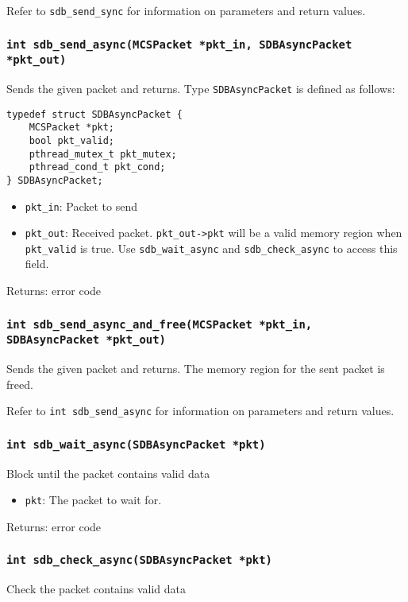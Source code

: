 \documentclass[12pt,a4paper]{report}
\begin{document}
Refer to \texttt{sdb\_send\_sync} for information on parameters and return values.

\subsubsection*{\texttt{int sdb\_send\_async(MCSPacket *pkt\_in, SDBAsyncPacket *pkt\_out)}}
Sends the given packet and returns. Type \texttt{SDBAsyncPacket} is defined as follows:

\begin{lstlisting}
typedef struct SDBAsyncPacket {
    MCSPacket *pkt;
    bool pkt_valid;
    pthread_mutex_t pkt_mutex;
    pthread_cond_t pkt_cond;
} SDBAsyncPacket;
\end{lstlisting}

\begin{itemize}
\item \texttt{pkt\_in}: Packet to send
\item \texttt{pkt\_out}: Received packet. \texttt{pkt\_out->pkt} will be a valid memory region when \texttt{pkt\_valid} is true. Use \texttt{sdb\_wait\_async} and \texttt{sdb\_check\_async} to access this field.
\end{itemize}

Returns: error code

\subsubsection*{\texttt{int sdb\_send\_async\_and\_free(MCSPacket *pkt\_in, SDBAsyncPacket *pkt\_out)}}
Sends the given packet and returns. The memory region for the sent packet is freed.

Refer to \texttt{int sdb\_send\_async} for information on parameters and return values.

\subsubsection*{\texttt{int sdb\_wait\_async(SDBAsyncPacket *pkt)}}
Block until the packet contains valid data

\begin{itemize}
\item \texttt{pkt}: The packet to wait for.
\end{itemize}

Returns: error code

\subsubsection*{\texttt{int sdb\_check\_async(SDBAsyncPacket *pkt)}}
Check the packet contains valid data
\end{document}
